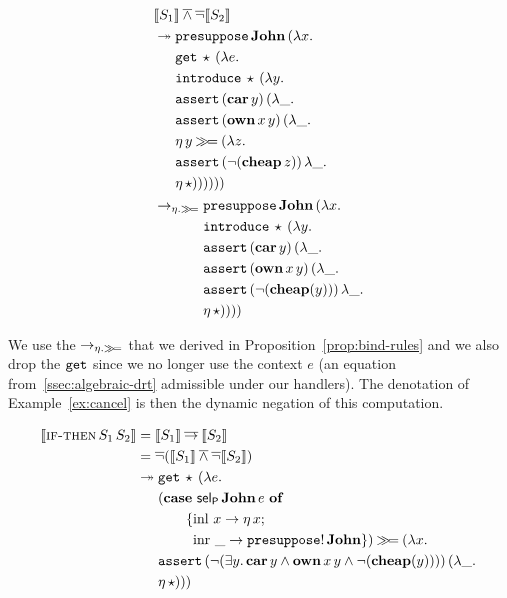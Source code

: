 \begin{align*}
  &\llbracket S_1 \rrbracket \mathbin{\overline{\land}} \mathop{\overline{\lnot}} \llbracket S_2 \rrbracket \\
  &\twoheadrightarrow \begin{aligned}[t]
      &\mathtt{presuppose}\,\textbf{John}\,(\lambda x.\,  \\
      &\mathtt{get}\,\star\,(\lambda e.\,  \\
      &\mathtt{introduce}\,\star\,(\lambda y.\,  \\
      &\mathtt{assert}\,(\textbf{car}\,y)\,(\lambda \_.\,  \\
      &\mathtt{assert}\,(\textbf{own}\,x\,y)\,(\lambda \_.\,  \\
      &\eta\,y \mathbin{\gg\!=} (\lambda z.\,  \\
      &\mathtt{assert}\,(\lnot (\textbf{cheap}\,z))\,\lambda \_.\,  \\
      &\eta\,\star))))))
    \end{aligned} \\
  &\to_{\eta.\mathbin{\gg\!=}} \begin{aligned}[t]
      &\mathtt{presuppose}\,\textbf{John}\,(\lambda x.\,  \\
      &\mathtt{introduce}\,\star\,(\lambda y.\,  \\
      &\mathtt{assert}\,(\textbf{car}\,y)\,(\lambda \_.\,  \\
      &\mathtt{assert}\,(\textbf{own}\,x\,y)\,(\lambda \_.\,  \\
      &\mathtt{assert}\,(\lnot (\textbf{cheap}(y)))\,\lambda \_.\,  \\
      &\eta\,\star))))
    \end{aligned}
\end{align*}

We use the $\to_{\eta.\mathbin{\gg\!=}}$ that we derived in
Proposition~\ref{prop:bind-rules} and we also drop the $\mathtt{get}$ since we
no longer use the context $e$ (an equation from~\ref{ssec:algebraic-drt}
admissible under our handlers). The denotation of Example~\ref{ex:cancel}
is then the dynamic negation of this computation.

\begin{align*}
  \llbracket \textsc{if-then}\,S_1\,S_2 \rrbracket
  &= \llbracket S_1 \rrbracket \mathbin{\overline{\to}} \llbracket S_2 \rrbracket \\
  &= \mathop{\overline{\lnot}} (\llbracket S_1 \rrbracket \mathbin{\overline{\land}} \mathop{\overline{\lnot}} \llbracket S_2 \rrbracket) \\
  &\twoheadrightarrow \begin{aligned}[t]
    &\mathtt{get}\,\star\,(\lambda e.\,  \\
    &(\text{\textbf{case} $\textsf{sel}_{\textsf{P}}\,\textbf{John}\,e$ \textbf{of}} \\ &\qquad \{\operatorname{inl}\,x \to \eta\,x; \\ &\qquad \ \operatorname{inr}\,\_ \to \mathtt{presuppose}!\,\textbf{John} \}) \mathbin{\gg\!=} (\lambda x.\,  \\
    &\mathtt{assert}\,(\lnot (\exists y.\, \textbf{car}\,y \land \textbf{own}\,x\,y \land \lnot (\textbf{cheap}(y))))\,(\lambda \_.\,  \\
    &\eta\,\star)))
    \end{aligned}
\end{align*}

